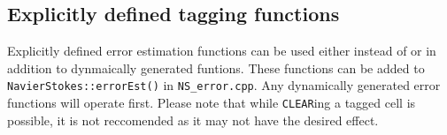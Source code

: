 \subsection{Explicitly defined tagging functions}
Explicitly defined error estimation functions can be used either instead of or in addition to
dynmaically generated funtions. These functions can be added to {\tt NavierStokes::errorEst()} in
{\tt NS\_error.cpp}. Any dynamically generated error functions will operate first.  
Please note that while {\tt CLEAR}ing a tagged cell is possible, it is not reccomended as it
may not have the desired effect.

